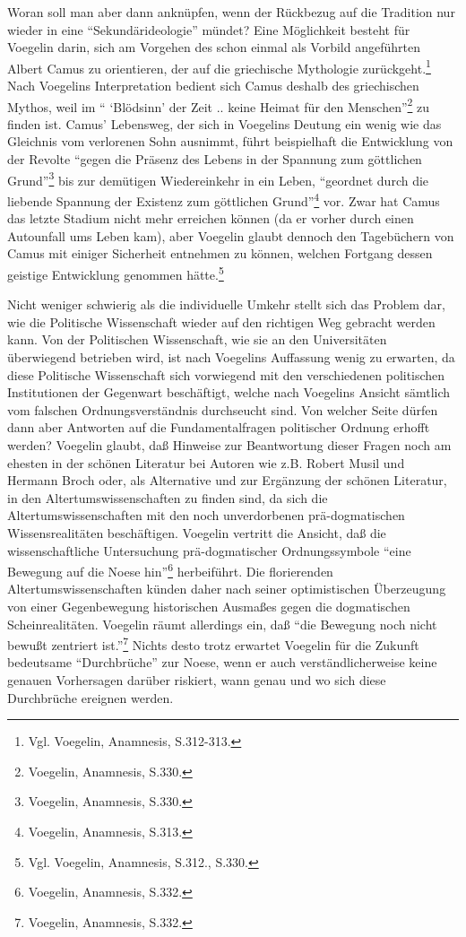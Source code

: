 Woran soll man aber dann anknüpfen, wenn der Rückbezug auf die Tradition nur
wieder in eine "`Sekundärideologie"' mündet? Eine Möglichkeit besteht für
Voegelin darin, sich am Vorgehen des schon einmal als Vorbild
angeführten Albert Camus zu orientieren, der auf die griechische Mythologie
zurückgeht.\footnote{Vgl. Voegelin, Anamnesis, S.312-313.} Nach Voegelins
Interpretation bedient sich Camus deshalb des griechischen Mythos, weil im "`
`Blödsinn' der Zeit .. keine Heimat für den Menschen"'\footnote{Voegelin,
  Anamnesis, S.330.} zu finden ist. Camus' Lebensweg, der sich in Voegelins
Deutung ein wenig wie das Gleichnis vom verlorenen Sohn ausnimmt, führt
beispielhaft die Entwicklung von der Revolte "`gegen die Präsenz des Lebens in
der Spannung zum göttlichen Grund"'\footnote{Voegelin, Anamnesis, S.330.} bis
zur demütigen Wiedereinkehr in ein Leben, "`geordnet durch die liebende
Spannung der Existenz zum göttlichen Grund"'\footnote{Voegelin, Anamnesis,
  S.313.} vor. Zwar hat Camus das letzte Stadium nicht mehr erreichen können
(da er vorher durch einen Autounfall ums Leben kam), aber Voegelin glaubt
dennoch den Tagebüchern von Camus mit einiger Sicherheit entnehmen zu
können, welchen Fortgang dessen geistige Entwicklung genommen
hätte.\footnote{Vgl. Voegelin, Anamnesis, S.312., S.330.}

Nicht weniger schwierig als die individuelle Umkehr stellt sich das Problem
dar, wie die Politische Wissenschaft wieder auf den richtigen Weg gebracht
werden kann. Von der Politischen Wissenschaft, wie sie an den Universitäten
überwiegend betrieben wird, ist nach Voegelins Auffassung wenig zu erwarten,
da diese Politische Wissenschaft sich vorwiegend mit den verschiedenen
politischen Institutionen der Gegenwart beschäftigt, welche nach Voegelins
Ansicht sämtlich vom falschen Ordnungsverständnis durchseucht sind. Von
welcher Seite dürfen dann aber Antworten auf die Fundamentalfragen politischer
Ordnung erhofft werden? Voegelin glaubt, daß Hinweise zur Beantwortung dieser
Fragen noch am ehesten in der schönen Literatur bei Autoren wie z.B. Robert
Musil und Hermann Broch oder, als Alternative und zur Ergänzung der schönen
Literatur, in den Altertumswissenschaften zu finden sind, da sich die
Altertumswissenschaften mit den noch unverdorbenen prä-dogmatischen
Wissensrealitäten beschäftigen. Voegelin vertritt die Ansicht, daß die
wissenschaftliche Untersuchung prä-dogmatischer Ordnungssymbole "`eine
Bewegung auf die Noese hin"'\footnote{Voegelin, Anamnesis, S.332.}
herbeiführt. Die florierenden Altertumswissenschaften künden daher nach seiner
optimistischen Überzeugung von einer Gegenbewegung historischen Ausmaßes gegen
die dogmatischen Scheinrealitäten.  Voegelin räumt allerdings
ein, daß "`die Bewegung noch nicht bewußt zentriert ist."'\footnote{Voegelin,
  Anamnesis, S.332.} Nichts desto trotz erwartet Voegelin für die Zukunft
bedeutsame "`Durchbrüche"' zur Noese, wenn er auch verständlicherweise keine
genauen Vorhersagen darüber riskiert, wann genau und wo sich diese
Durchbrüche ereignen werden.

